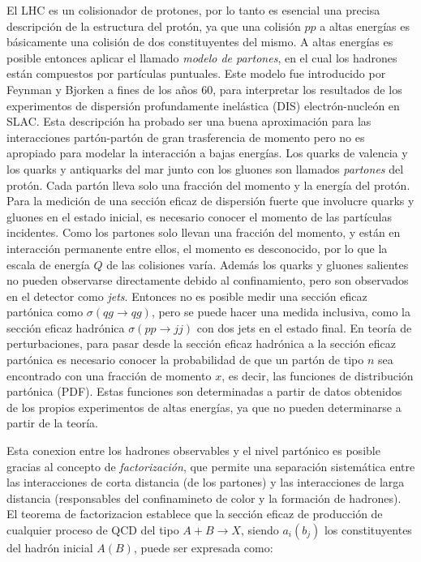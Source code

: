 El LHC es un colisionador de protones, por lo tanto es esencial una precisa
descripción de la estructura del protón, ya que una colisión $pp$ a altas
energías es básicamente una colisión de dos constituyentes del mismo.
A altas energías es posible entonces aplicar el llamado \emph{modelo de
  partones}, en el cual los hadrones están compuestos por partículas puntuales.
Este modelo fue introducido por Feynman \cite{PhysRevLett.23.1415} y Bjorken
\cite{PhysRev.185.1975} a fines de los a\~nos 60, para interpretar los
resultados de los experimentos de dispersión profundamente inelástica (DIS)
electrón-nucleón en SLAC. Esta descripción ha probado ser una buena aproximación
para las interacciones partón-partón de gran trasferencia de momento pero no es
apropiado para modelar la interacción a bajas energías. Los quarks de valencia y
los quarks y antiquarks del mar junto con los gluones son llamados
\emph{partones} del protón. Cada partón lleva solo una fracción del momento y la
energía del protón. Para la medición de una sección eficaz de dispersión fuerte
que involucre quarks y gluones en el estado inicial, es necesario conocer el
momento de las partículas incidentes. Como los partones solo llevan una fracción
del momento, y están en interacción permanente entre ellos, el momento es
desconocido, por lo que la escala de energía $Q$ de las colisiones varía. Además los quarks y
gluones salientes no pueden observarse directamente debido al confinamiento,
pero son observados en el detector como \emph{jets}. Entonces no es posible
medir una sección eficaz partónica como $\sigma(qg \to qg)$, pero se puede hacer
una medida inclusiva, como la sección eficaz hadrónica $\sigma(pp \to jj)$ con
dos jets en el estado final. En teoría de perturbaciones, para pasar desde la
sección eficaz hadrónica a la sección eficaz partónica es necesario conocer la
probabilidad de que un partón de tipo $n$ sea encontrado con una fracción de
momento $x$, es decir, las funciones de distribución partónica (PDF). Estas
funciones son determinadas a partir de datos obtenidos de los propios
experimentos de altas energías, ya que no pueden determinarse a partir de la
teoría.

Esta conexion entre los hadrones observables y el nivel partónico es posible
gracias al concepto de \emph{factorización}, que permite una separación
sistemática entre las interacciones de corta distancia (de los partones) y las
interacciones de larga distancia (responsables del confinamineto de color y la
formación de hadrones). El teorema de factorizacion \cite{Ellis1978281}
establece que la sección eficaz de producción de cualquier proceso de QCD del
tipo $A+B\to X$, siendo $a_i(b_j)$ los constituyentes del hadrón inicial $A(B)$,
puede ser expresada como:


